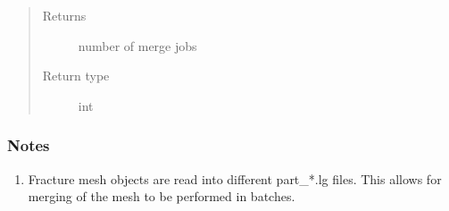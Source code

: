 \documentclass[letterpaper,10pt,english]{sphinxmanual}
\begin{document}
\begin{fulllineitems}
\begin{quote}
\begin{description}
\begin{itemize}
\end{itemize}

\item[{Returns}] \leavevmode
{} \textendash{} number of merge jobs

\item[{Return type}] \leavevmode
int

\end{description}\end{quote}
\subsubsection*{Notes}
\begin{enumerate}
\def\theenumi{\arabic{enumi}}
\def\labelenumi{\theenumi .}
\makeatletter\def\p@enumii{\p@enumi \theenumi .}\makeatother
\item {} 
Fracture mesh objects are read into different part\_*.lg files. This allows for merging of the mesh to be performed in batches.

\end{enumerate}

\end{fulllineitems}

\end{document}
